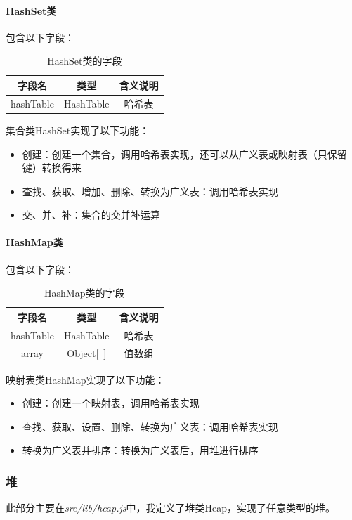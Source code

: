\documentclass[scheme = chinese]{ctexart}
\begin{document}
\paragraph{HashSet类} 包含以下字段：
\begin{table}[H]
    \centering
    \caption{HashSet类的字段}
    \begin{tabular}{ccc}
        \toprule
        字段名 & 类型 & 含义说明 \\
        \midrule
        hashTable & HashTable & 哈希表 \\
        \bottomrule
    \end{tabular}
\end{table}

集合类HashSet实现了以下功能：
\begin{itemize}
    \item 创建：创建一个集合，调用哈希表实现，还可以从广义表或映射表（只保留键）转换得来
    \item 查找、获取、增加、删除、转换为广义表：调用哈希表实现
    \item 交、并、补：集合的交并补运算
\end{itemize}

\paragraph{HashMap类} 包含以下字段：
\begin{table}[H]
    \centering
    \caption{HashMap类的字段}
    \begin{tabular}{ccc}
        \toprule
        字段名 & 类型 & 含义说明 \\
        \midrule
        hashTable & HashTable & 哈希表 \\
        array & Object[~] & 值数组 \\
        \bottomrule
    \end{tabular}
\end{table}

映射表类HashMap实现了以下功能：
\begin{itemize}
    \item 创建：创建一个映射表，调用哈希表实现
    \item 查找、获取、设置、删除、转换为广义表：调用哈希表实现
    \item 转换为广义表并排序：转换为广义表后，用堆进行排序
\end{itemize}

\subsubsection{堆}
此部分主要在\emph{src/lib/heap.js}中，我定义了堆类Heap，实现了任意类型的堆。
\end{document}
